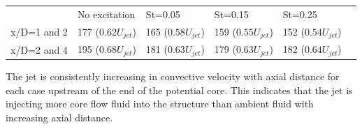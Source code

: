 \documentclass[english]{aiaa-tc}
\begin{document}
\begin{center}
	\begin{tabular}{|l|l|l|l|l|l}
		 & No excitation & St=0.05 & St=0.15 & St=0.25 \\
		x/D=1 and 2 & 177 ($0.62U_{jet}$) & 165 ($0.58U_{jet}$) & 159 ($0.55U_{jet}$) & 152 ($0.54U_{jet}$) \\
		x/D=2 and 4 & 195 ($0.68U_{jet}$) & 181 ($0.63U_{jet}$) & 179 ($0.63U_{jet}$) & 182 ($0.64U_{jet}$) \\
	\end{tabular}
	\label{tab:nearnozzleconvec}
\end{center}
The jet is consistently increasing in convective velocity with axial distance for each case upstream of the end of the potential core.
This indicates that the jet is injecting more core flow fluid into the structure than ambient fluid with increasing axial distance.

\end{document}
